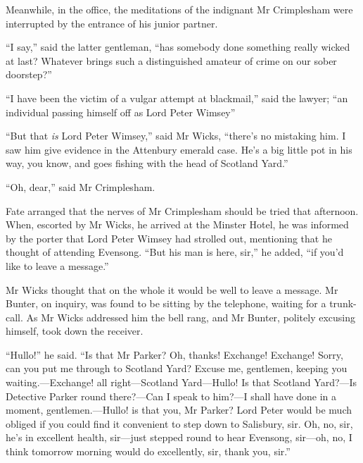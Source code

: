 Meanwhile, in the office, the meditations of the indignant Mr Crimplesham were interrupted by the entrance of his junior partner.

\enquote{I say,} said the latter gentleman, \enquote{has somebody done something really wicked at last? Whatever brings such a distinguished amateur of crime on our sober doorstep?}

\enquote{I have been the victim of a vulgar attempt at blackmail,} said the lawyer; \enquote{an individual passing himself off as Lord Peter Wimsey\longdash}

\enquote{But that \textit{is} Lord Peter Wimsey,} said Mr Wicks, \enquote{there’s no mistaking him. I saw him give evidence in the Attenbury emerald case. He’s a big little pot in his way, you know, and goes fishing with the head of Scotland Yard.}

\enquote{Oh, dear,} said Mr Crimplesham.

Fate arranged that the nerves of Mr Crimplesham should be tried that afternoon. When, escorted by Mr Wicks, he arrived at the Minster Hotel, he was informed by the porter that Lord Peter Wimsey had strolled out, mentioning that he thought of attending Evensong. \enquote{But his man is here, sir,} he added, \enquote{if you’d like to leave a message.}

Mr Wicks thought that on the whole it would be well to leave a message. Mr Bunter, on inquiry, was found to be sitting by the telephone, waiting for a trunk-call. As Mr Wicks addressed him the bell rang, and Mr Bunter, politely excusing himself, took down the receiver.

\enquote{Hullo!} he said. \enquote{Is that Mr Parker? Oh, thanks! Exchange! Exchange! Sorry, can you put me through to Scotland Yard? Excuse me, gentlemen, keeping you waiting.---Exchange! all right\allowbreak---\allowbreak Scotland Yard\allowbreak---\allowbreak Hullo! Is that Scotland Yard?---Is Detective Parker round there?---Can I speak to him?---I shall have done in a moment, gentlemen.---Hullo! is that you, Mr Parker? Lord Peter would be much obliged if you could find it convenient to step down to Salisbury, sir. Oh, no, sir, he’s in excellent health, sir\allowbreak---\allowbreak just stepped round to hear Evensong, sir\allowbreak---\allowbreak oh, no, I think tomorrow morning would do excellently, sir, thank you, sir.}